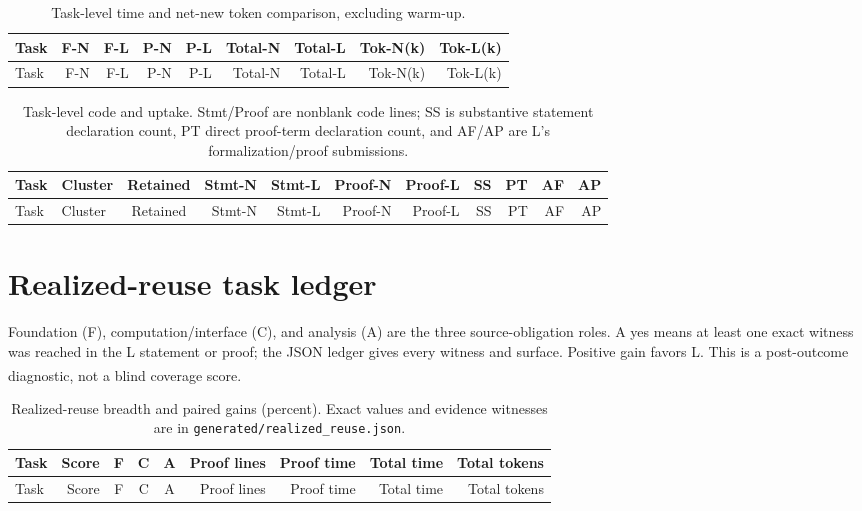 \documentclass[10pt,a4paper]{article}
\newcommand{\src}[1]{\textsuperscript{\cite{#1}}}
\begin{document}
\begin{landscape}\small
\begin{longtable}{@{}lrrrrrrrr@{}}
\caption{Task-level time and net-new token comparison, excluding warm-up.\cite{results35,plotcode}}\label{tab:times}\\
\toprule Task & F-N & F-L & P-N & P-L & Total-N & Total-L & Tok-N(k) & Tok-L(k)\\\midrule\endfirsthead
\toprule Task & F-N & F-L & P-N & P-L & Total-N & Total-L & Tok-N(k) & Tok-L(k)\\\midrule\endhead

\end{longtable}
\vspace{3mm}
\begin{longtable}{@{}llcrrrrrrrr@{}}
\caption{Task-level code and uptake. Stmt/Proof are nonblank code lines; SS is substantive statement declaration count, PT direct proof-term declaration count, and AF/AP are L's formalization/proof submissions.\cite{results35,plotcode}}\label{tab:code}\\
\toprule Task & Cluster & Retained & Stmt-N & Stmt-L & Proof-N & Proof-L & SS & PT & AF & AP\\\midrule\endfirsthead
\toprule Task & Cluster & Retained & Stmt-N & Stmt-L & Proof-N & Proof-L & SS & PT & AF & AP\\\midrule\endhead

\end{longtable}
\end{landscape}

\section{Realized-reuse task ledger}

Foundation (F), computation/interface (C), and analysis (A) are the three
source-obligation roles. A yes means at least one exact witness was reached in
the L statement or proof; the JSON ledger gives every witness and surface.
Positive gain favors L. This is a post-outcome diagnostic, not a blind
coverage score.\src{reusemap,realizedreuse,results35}

\begin{landscape}\small
\begin{longtable}{@{}lrcccrrrr@{}}
\caption{Realized-reuse breadth and paired gains (percent). Exact values and evidence witnesses are in \texttt{generated/realized\_reuse.json}.\cite{reusemap,realizedreuse,results35}}\label{tab:reuse}\\
\toprule Task & Score & F & C & A & Proof lines & Proof time & Total time & Total tokens\\\midrule\endfirsthead
\toprule Task & Score & F & C & A & Proof lines & Proof time & Total time & Total tokens\\\midrule\endhead

\end{longtable}
\end{landscape}
\end{document}
